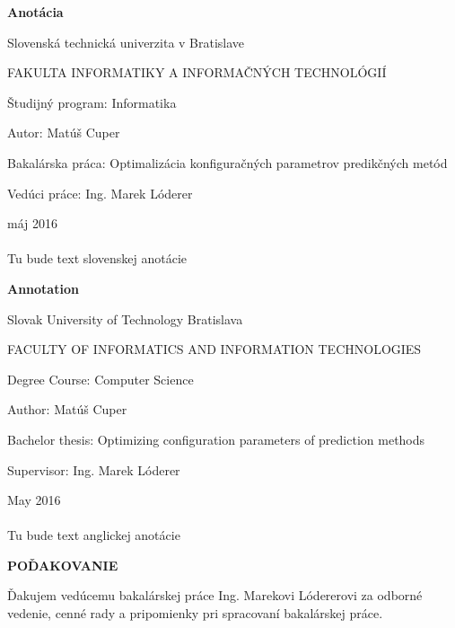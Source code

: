 \documentclass[a4paper,slovak,12pt,appendix]{article}
\begin{document}

\newpage
\thispagestyle{plain}
\vspace*{1.5cm}
\begin{center}
  \begin{Large}
    \textbf{Anotácia} \par
  \end{Large}
\end{center}
{Slovenská technická univerzita v Bratislave \par}
{FAKULTA INFORMATIKY A INFORMAČNÝCH TECHNOLÓGIÍ \par}
{Študijný program: Informatika \par}
{Autor: Matúš Cuper \par}
{Bakalárska práca: Optimalizácia konfiguračných parametrov predikčných metód \par}
{Vedúci práce: Ing. Marek Lóderer \par}
{máj 2016 \\} \\
Tu bude text slovenskej anotácie

\newpage
\thispagestyle{plain}
\vspace*{1.5cm}
\begin{center}
  \begin{Large}
    \textbf{Annotation} \par
  \end{Large}
\end{center}
{Slovak University of Technology Bratislava \par}
{FACULTY OF INFORMATICS AND INFORMATION TECHNOLOGIES \par}
{Degree Course: Computer Science \par}
{Author: Matúš Cuper \par}
{Bachelor thesis: Optimizing configuration parameters of prediction methods \par}
{Supervisor: Ing. Marek Lóderer \par}
{May 2016 \\} \\
Tu bude text anglickej anotácie


\newpage
\thispagestyle{plain}
\vspace*{15cm}
\begin{large}
  \noindent \textbf{POĎAKOVANIE} \par
\end{large}
\vspace*{0.5cm}
\noindent
Ďakujem vedúcemu bakalárskej práce Ing. Marekovi Lódererovi za odborné vedenie,
cenné rady a pripomienky pri spracovaní bakalárskej práce.
\end{document}
